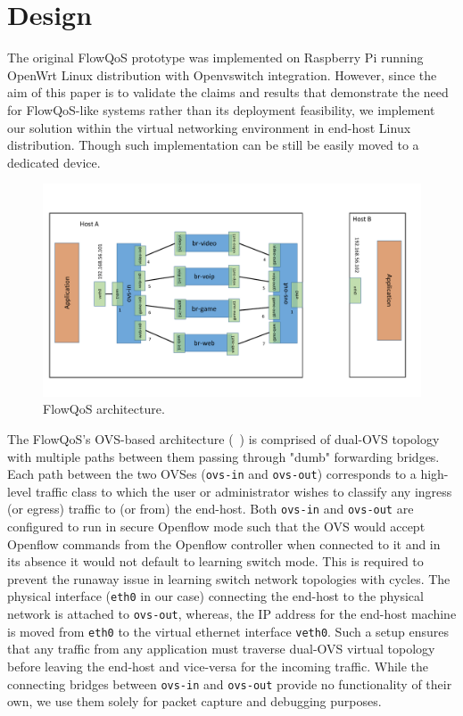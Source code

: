 \section{Design}
\label{sec:design}

The original FlowQoS prototype was implemented on Raspberry Pi running OpenWrt Linux distribution with Openvswitch integration. However, since the aim of this paper is to validate the claims and results that demonstrate the need for FlowQoS-like systems rather than its deployment feasibility, we implement our solution within the virtual networking environment in end-host Linux distribution. Though such implementation can be still be easily moved to a dedicated device.

\begin{figure}[t]
\centering
\includegraphics[width=0.9\linewidth]{architecture}
\caption{FlowQoS architecture.}
\label{fig:architecture}
\end{figure}

The FlowQoS's OVS-based architecture (~) is comprised of dual-OVS topology with multiple paths between them passing through "dumb" forwarding bridges. Each path between the two OVSes (\texttt{ovs-in} and \texttt{ovs-out}) corresponds to a high-level traffic class to which the user or administrator wishes to classify any ingress (or egress) traffic to (or from) the end-host. Both \texttt{ovs-in} and \texttt{ovs-out} are configured to run in secure Openflow mode such that the OVS would accept Openflow commands from the Openflow controller when connected to it and in its absence it would not default to learning switch mode. This is required to prevent the runaway issue in learning switch network topologies with cycles. The physical interface (\texttt{eth0} in our case) connecting the end-host to the physical network is attached to \texttt{ovs-out}, whereas, the IP address for the end-host machine is moved from \texttt{eth0} to the virtual ethernet interface \texttt{veth0}. Such a setup ensures that any traffic from any application must traverse dual-OVS virtual topology before leaving the end-host and vice-versa for the incoming traffic. While the connecting bridges between \texttt{ovs-in} and \texttt{ovs-out} provide no functionality of their own, we use them solely for packet capture and debugging purposes.


